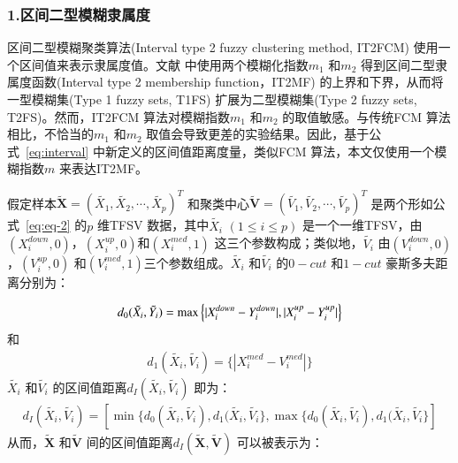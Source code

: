 \subsubsection*{1.区间二型模糊隶属度}
\label{subsec::chap03-3-3-2-1}
区间二型模糊聚类算法(Interval type 2 fuzzy clustering method, IT2FCM) 使用一个区间值来表示隶属度值。文献\cite{hwang2007uncertain} 中使用两个模糊化指数$m_1$ 和$m_2$ 得到区间二型隶属度函数(Interval type 2 membership function，IT2MF) 的上界和下界，从而将一型模糊集(Type 1 fuzzy sets, T1FS) 扩展为二型模糊集(Type 2 fuzzy sets, T2FS)。然而，IT2FCM 算法对模糊指数$m_1$ 和$m_2$ 的取值敏感。与传统FCM 算法相比，不恰当的$m_1$ 和$m_2$ 取值会导致更差的实验结果。因此，基于公式~\ref{eq:interval} 中新定义的区间值距离度量，类似FCM 算法，本文仅使用一个模糊指数$m$ 来表达IT2MF。


假定样本$\bm{\tilde{X}} = (\tilde{X_1}, \tilde{X_2},\cdots, \tilde{X_p})^T$ 和聚类中心$\bm{\tilde{V}} = (\tilde{V_1}, \tilde{V_2},\cdots, \tilde{V_p})^T$ 是两个形如公式~\ref{eq:eq-2} 的$p$ 维TFSV 数据，其中$\tilde{X_i}$ $(1 \leq i \leq p)$ 是一个一维TFSV，由$(X_{i}^{down}, 0)$，$(X_{i}^{up}, 0)$和$(X_i^{med}, 1)$ 这三个参数构成；类似地，$\tilde{V_i}$ 由$(V_{i}^{down}, 0)$，$(V_{i}^{up}, 0)$ 和$(V_i^{med}, 1)$三个参数组成。$\tilde{X_i}$ 和$\tilde{V_i}$ 的$0-cut$ 和$1-cut$ 豪斯多夫距离分别为：

\begin{equation}\label{eq:eq-3}
    \begin{split}
        d_0 (\tilde{X_i}, \tilde{Y_{i}}) = \max \Big \lbrace \lvert X_i^{down} - Y_i^{down}\rvert, \lvert X_i^{up} - Y_i^{up}\rvert \Big \rbrace
    \end{split}
\end{equation}
和
\begin{equation}\label{eq:eq-4}
    \begin{split}
        d_1 (\tilde{X_i}, \tilde{V_{i}}) = \Big\lbrace |X_i^{med} - V_i^{med}| \Big\rbrace
    \end{split}
\end{equation}
$\tilde{X_i}$ 和$\tilde{V_{i}}$ 的区间值距离$d_{I} (\tilde{X_i}, \tilde{V_i})$ 即为：
\begin{equation}\label{eq:eq-5}
    \begin{split}
        d_{I} (\tilde{X_i}, \tilde{V_i}) = [\min \lbrace d_0 (\tilde{X_i}, \tilde{V_{i}}) , d_1 (\tilde{X_i}, \tilde{V_{i}}  \rbrace,\max  \lbrace d_0 (\tilde{X_i}, \tilde{V_{i}}) , d_1 (\tilde{X_i}, \tilde{V_{i}}  \rbrace]
    \end{split}
\end{equation}
从而，$\bm{\tilde{X}}$ 和$\bm{\tilde{V}}$ 间的区间值距离$d_{I} (\bm{\tilde{X}}, \bm{\tilde{V}})$ 可以被表示为：

